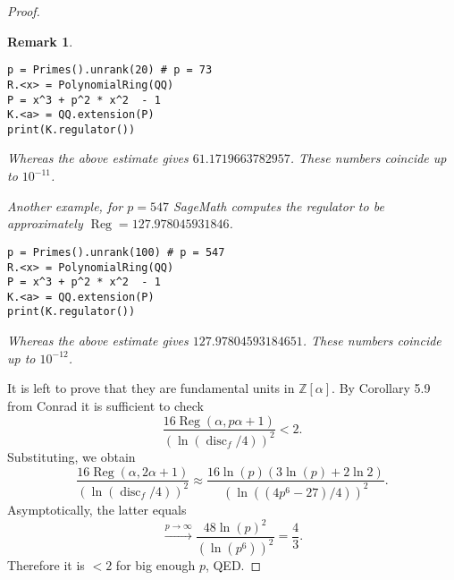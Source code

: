 \documentclass[a4paper]{article}
\newtheorem{Rem}[Thm]{Remark}
\DeclareMathOperator{\Reg}{Reg}        %
\DeclareMathOperator{\disc}{disc}        %
\begin{document}
\begin{proof}
\begin{Rem}
\begin{lstlisting}[style=sagemath, caption=SageMath code]
p = Primes().unrank(20) # p = 73
R.<x> = PolynomialRing(QQ)
P = x^3 + p^2 * x^2  - 1
K.<a> = QQ.extension(P)
print(K.regulator())
\end{lstlisting}
Whereas the above estimate gives $61.1719663782957$.
These numbers coincide up to $10^{-11} $.

Another example, for $p = 547$ SageMath computes the regulator to be approximately $\Reg = 127.978045931846$.

\begin{lstlisting}[style=sagemath, caption=SageMath code]
p = Primes().unrank(100) # p = 547
R.<x> = PolynomialRing(QQ)
P = x^3 + p^2 * x^2  - 1
K.<a> = QQ.extension(P)
print(K.regulator())
\end{lstlisting}
Whereas the above estimate gives $127.97804593184651$.
These numbers coincide up to $10^{-12} $.

\end{Rem}

It is left to prove that they are fundamental units in $\mathbb{Z}[\alpha]$.
By Corollary 5.9 from Conrad it is sufficient to check
\[
\frac{16 \Reg(\alpha, p\alpha + 1) }
{(\ln(\disc_f/4))^2} 
< 2
.\] 
Substituting, we obtain
\[
\frac{16 \Reg(\alpha, 2\alpha + 1) }
{(\ln(\disc_f/4))^2} 
\approx
\frac{16 
\ln(p) ( 3 \ln(p) + 2 \ln 2 )
 }
{(\ln(
(4 p^6 - 27)
/4))^2} 
.\] 
Asymptotically, the latter equals
\[
\stackrel{p \to \infty}{\longrightarrow}
\frac{48
\ln(p)^2
}
{(\ln(
p^6 ))^2} = \frac{4}{3}
.\] 
Therefore it is $< 2$ for big enough $p$, QED.
\end{proof}
\end{document}
